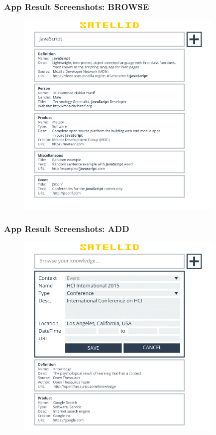 \documentclass[10pt, compress]{beamer}
\begin{document}

\begin{frame}[fragile]
  \frametitle{App Result Screenshots: BROWSE}

  \begin{figure}[ht]
    \centering
    \vspace{-1cm}
    \includegraphics[height=10cm]{include/satellid-app-results_browse.png}
    \vspace{-10pt}
    \label{fig:satellid-app-results_browse}
  \end{figure}

\end{frame}


\begin{frame}[fragile]
  \frametitle{App Result Screenshots: ADD}

  \begin{figure}[ht]
    \centering
    \vspace{-1cm}
    \includegraphics[height=10cm]{include/satellid-app-results_add.png}
    \vspace{-10pt}
    \label{fig:satellid-app-results_add}
  \end{figure}

\end{frame}
\end{document}
